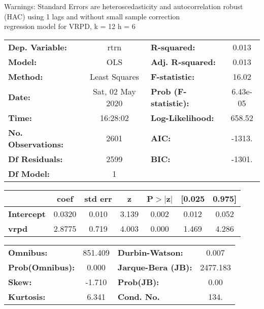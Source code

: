 Warnings: \newline
 [1] Standard Errors are heteroscedasticity and autocorrelation robust (HAC) using 1 lags and without small sample correction\\ 

regression model for VRPD, k = 12 h = 6\begin{center}
\begin{tabular}{lclc}
\toprule
\textbf{Dep. Variable:}    &       rtrn       & \textbf{  R-squared:         } &     0.013   \\
\textbf{Model:}            &       OLS        & \textbf{  Adj. R-squared:    } &     0.013   \\
\textbf{Method:}           &  Least Squares   & \textbf{  F-statistic:       } &     16.02   \\
\textbf{Date:}             & Sat, 02 May 2020 & \textbf{  Prob (F-statistic):} &  6.43e-05   \\
\textbf{Time:}             &     16:28:02     & \textbf{  Log-Likelihood:    } &    658.52   \\
\textbf{No. Observations:} &        2601      & \textbf{  AIC:               } &    -1313.   \\
\textbf{Df Residuals:}     &        2599      & \textbf{  BIC:               } &    -1301.   \\
\textbf{Df Model:}         &           1      & \textbf{                     } &             \\
\bottomrule
\end{tabular}
\begin{tabular}{lcccccc}
                   & \textbf{coef} & \textbf{std err} & \textbf{z} & \textbf{P$> |$z$|$} & \textbf{[0.025} & \textbf{0.975]}  \\
\midrule
\textbf{Intercept} &       0.0320  &        0.010     &     3.139  &         0.002        &        0.012    &        0.052     \\
\textbf{vrpd}      &       2.8775  &        0.719     &     4.003  &         0.000        &        1.469    &        4.286     \\
\bottomrule
\end{tabular}
\begin{tabular}{lclc}
\textbf{Omnibus:}       & 851.409 & \textbf{  Durbin-Watson:     } &    0.007  \\
\textbf{Prob(Omnibus):} &   0.000 & \textbf{  Jarque-Bera (JB):  } & 2477.183  \\
\textbf{Skew:}          &  -1.710 & \textbf{  Prob(JB):          } &     0.00  \\
\textbf{Kurtosis:}      &   6.341 & \textbf{  Cond. No.          } &     134.  \\
\bottomrule
\end{tabular}
\end{center}

